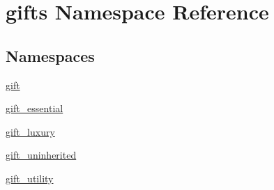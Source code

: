 \hypertarget{namespacegifts}{}\section{gifts Namespace Reference}
\label{namespacegifts}
\subsection*{Namespaces}
\begin{DoxyCompactItemize}
\item 
 \hyperlink{namespacegifts_1_1gift}{gift}
\item 
 \hyperlink{namespacegifts_1_1gift__essential}{gift\+\_\+essential}
\item 
 \hyperlink{namespacegifts_1_1gift__luxury}{gift\+\_\+luxury}
\item 
 \hyperlink{namespacegifts_1_1gift__uninherited}{gift\+\_\+uninherited}
\item 
 \hyperlink{namespacegifts_1_1gift__utility}{gift\+\_\+utility}
\end{DoxyCompactItemize}
